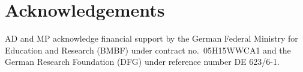 \documentclass[11pt,epsf]{article}
\begin{document}
\section*{Acknowledgements}

AD and MP acknowledge financial support by the
German Federal Ministry for Education and Research (BMBF) under
contract no.~05H15WWCA1 and the German Research Foundation (DFG) under
reference number DE 623/6-1.





\end{document}
